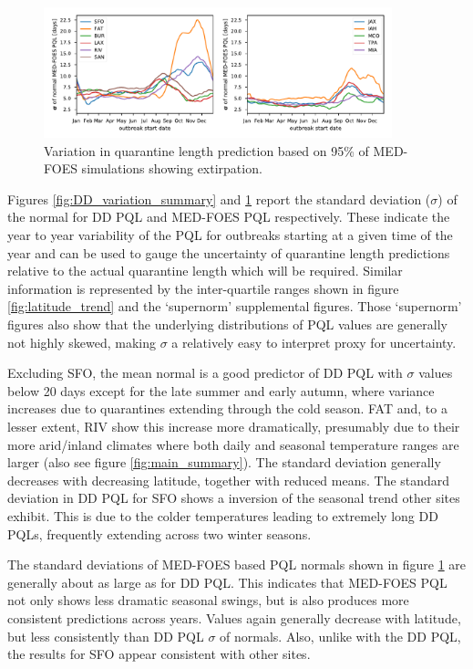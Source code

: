 \documentclass[10pt,a4paper,twocolumn]{article}
\begin{document}
\begin{figure}[ht!]
\centering
\includegraphics[width=0.9\textwidth]{figs/fig_pe95_variation.pdf}
\caption{\label{fig:pe95_variation_summary}Variation in quarantine length prediction 
based on 95\% of MED-FOES simulations showing extirpation.}
\end{figure}


Figures \ref{fig:DD_variation_summary} and \ref{fig:pe95_variation_summary}
report the standard deviation ($\sigma$) of the normal for DD PQL and MED-FOES PQL 
respectively.
These indicate the year to year variability of the PQL for outbreaks starting at a
given time of the year and can be used to gauge the uncertainty of quarantine 
length predictions relative to the actual quarantine length which will be required.
Similar information is represented by the inter-quartile ranges 
shown in figure \ref{fig:latitude_trend} and the `supernorm' supplemental figures.
Those `supernorm' figures also show that the underlying distributions of PQL 
values are generally not highly skewed, making $\sigma$ a relatively easy to interpret 
proxy for uncertainty.

Excluding SFO, the mean normal is a good predictor of DD PQL with $\sigma$ values below 20 days
except for the late summer and early autumn, where variance increases 
due to quarantines extending through the cold season.
FAT and, to a lesser extent, RIV show this increase more dramatically, presumably due to their more 
arid/inland climates where both daily and seasonal temperature ranges are larger
(also see figure \ref{fig:main_summary}).
The standard deviation generally decreases with decreasing latitude, together with reduced means.
The standard deviation in DD PQL for SFO shows a inversion of the seasonal trend 
other sites exhibit.
This is due to the colder temperatures leading to extremely long DD PQLs, 
frequently extending across two winter seasons.

The standard deviations of MED-FOES based PQL normals 
shown in figure \ref{fig:pe95_variation_summary}
are generally about  as large as for DD PQL.
This indicates that MED-FOES PQL not only shows less dramatic seasonal swings, 
but is also produces more consistent predictions across years.
Values again generally decrease with latitude, but less consistently than DD PQL $\sigma$ of normals.
Also, unlike with the DD PQL, the results for SFO appear consistent with other sites.
\end{document}
